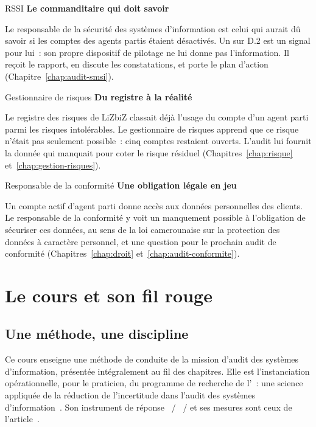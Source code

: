 \begin{boxmetier}{RSSI}
\textbf{Le commanditaire qui doit savoir}

Le responsable de la sécurité des systèmes d'information est celui qui
aurait dû savoir si les comptes des agents partis étaient désactivés. Un
\NEK{} sur D.2 est un signal pour lui~: son propre dispositif de pilotage
ne lui donne pas l'information. Il reçoit le rapport, en discute les
constatations, et porte le plan d'action (Chapitre~\ref{chap:audit-smsi}).
\end{boxmetier}

\begin{boxmetier}{Gestionnaire de risques}
\textbf{Du registre à la réalité}

Le registre des risques de LiZbiZ classait déjà l'usage du compte d'un
agent parti parmi les risques intolérables. Le gestionnaire de risques
apprend que ce risque n'était pas seulement possible~: cinq comptes
restaient ouverts. L'audit lui fournit la donnée qui manquait pour coter
le risque résiduel (Chapitres~\ref{chap:risque}
et~\ref{chap:gestion-risques}).
\end{boxmetier}

\begin{boxmetier}{Responsable de la conformité}
\textbf{Une obligation légale en jeu}

Un compte actif d'agent parti donne accès aux données personnelles des
clients. Le responsable de la conformité y voit un manquement possible à
l'obligation de sécuriser ces données, au sens de la loi camerounaise sur
la protection des données à caractère personnel, et une question pour le
prochain audit de conformité (Chapitres~\ref{chap:droit}
et~\ref{chap:audit-conformite}).
\end{boxmetier}

\section{Le cours et son fil rouge}
\label{sec:pro-cours}

\subsection{Une méthode, une discipline}

Ce cours enseigne une méthode de conduite de la mission d'audit des
systèmes d'information, présentée intégralement au fil des chapitres. Elle
est l'instanciation opérationnelle, pour le praticien, du programme de
recherche de l'~: une science
appliquée de la réduction de l'incertitude dans l'audit des systèmes
d'information~\cite{minka2026auditologie}. Son instrument de réponse
\OUI{}~/ \NON{}~/ \NEK{} et ses mesures sont ceux de
l'article~\cite{minka2026nek}.

